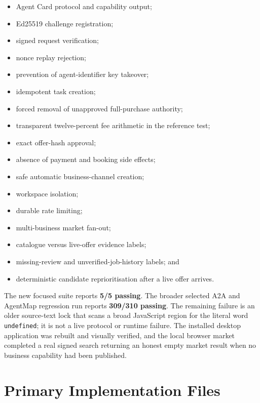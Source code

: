 \documentclass[11pt,a4paper]{article}
\newcommand{\code}[1]{\texttt{#1}}
\begin{document}
\begin{itemize}
  \item Agent Card protocol and capability output;
  \item Ed25519 challenge registration;
  \item signed request verification;
  \item nonce replay rejection;
  \item prevention of agent-identifier key takeover;
  \item idempotent task creation;
  \item forced removal of unapproved full-purchase authority;
  \item transparent twelve-percent fee arithmetic in the reference test;
  \item exact offer-hash approval;
  \item absence of payment and booking side effects;
  \item safe automatic business-channel creation;
  \item workspace isolation;
  \item durable rate limiting;
  \item multi-business market fan-out;
  \item catalogue versus live-offer evidence labels;
  \item missing-review and unverified-job-history labels; and
  \item deterministic candidate reprioritisation after a live offer arrives.
\end{itemize}

The new focused suite reports \textbf{5/5 passing}.  The broader selected A2A
and AgentMap regression run reports \textbf{309/310 passing}.  The remaining
failure is an older source-text lock that scans a broad JavaScript region for
the literal word \code{undefined}; it is not a live protocol or runtime failure.
The installed desktop application was rebuilt and visually verified, and the
local browser market completed a real signed search returning an honest empty
market result when no business capability had been published.

\section{Primary Implementation Files}
\end{document}
